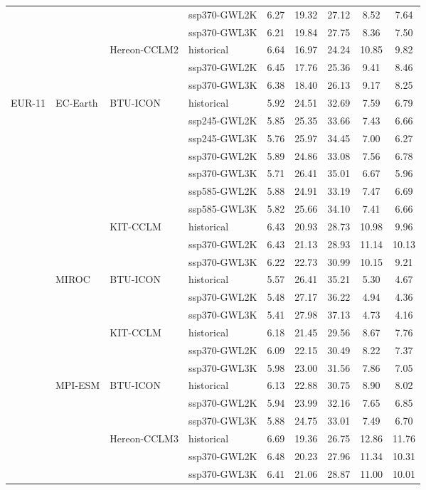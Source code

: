 \begin{table}[!htbp]
{\begin{tabular}{lll|l|c|c|c|c|c}
 &  &  & ssp370-GWL2K & 6.27 & 19.32 & 27.12 & 8.52 & 7.64 \\
 &  &  & ssp370-GWL3K & 6.21 & 19.84 & 27.75 & 8.36 & 7.50 \\
\cmidrule(lr){3-9}
 &  & \multirow{3}{*}{Hereon-CCLM2} & historical & 6.64 & 16.97 & 24.24 & 10.85 & 9.82 \\
 &  &  & ssp370-GWL2K & 6.45 & 17.76 & 25.36 & 9.41 & 8.46 \\
 &  &  & ssp370-GWL3K & 6.38 & 18.40 & 26.13 & 9.17 & 8.25 \\
\midrule
\multirow{22}{*}{EUR-11} & \multirow{10}{*}{EC-Earth} & \multirow{7}{*}{BTU-ICON} & historical & 5.92 & 24.51 & 32.69 & 7.59 & 6.79 \\
 &  &  & ssp245-GWL2K & 5.85 & 25.35 & 33.66 & 7.43 & 6.66 \\
 &  &  & ssp245-GWL3K & 5.76 & 25.97 & 34.45 & 7.00 & 6.27 \\
 &  &  & ssp370-GWL2K & 5.89 & 24.86 & 33.08 & 7.56 & 6.78 \\
 &  &  & ssp370-GWL3K & 5.71 & 26.41 & 35.01 & 6.67 & 5.96 \\
 &  &  & ssp585-GWL2K & 5.88 & 24.91 & 33.19 & 7.47 & 6.69 \\
 &  &  & ssp585-GWL3K & 5.82 & 25.66 & 34.10 & 7.41 & 6.66 \\
\cmidrule(lr){3-9}
 &  & \multirow{3}{*}{KIT-CCLM} & historical & 6.43 & 20.93 & 28.73 & 10.98 & 9.96 \\
 &  &  & ssp370-GWL2K & 6.43 & 21.13 & 28.93 & 11.14 & 10.13 \\
 &  &  & ssp370-GWL3K & 6.22 & 22.73 & 30.99 & 10.15 & 9.21 \\
\cmidrule(lr){3-9}
\cmidrule(lr){2-9}
 & \multirow{6}{*}{MIROC} & \multirow{3}{*}{BTU-ICON} & historical & 5.57 & 26.41 & 35.21 & 5.30 & 4.67 \\
 &  &  & ssp370-GWL2K & 5.48 & 27.17 & 36.22 & 4.94 & 4.36 \\
 &  &  & ssp370-GWL3K & 5.41 & 27.98 & 37.13 & 4.73 & 4.16 \\
\cmidrule(lr){3-9}
 &  & \multirow{3}{*}{KIT-CCLM} & historical & 6.18 & 21.45 & 29.56 & 8.67 & 7.76 \\
 &  &  & ssp370-GWL2K & 6.09 & 22.15 & 30.49 & 8.22 & 7.37 \\
 &  &  & ssp370-GWL3K & 5.98 & 23.00 & 31.56 & 7.86 & 7.05 \\
\cmidrule(lr){3-9}
\cmidrule(lr){2-9}
 & \multirow{6}{*}{MPI-ESM} & \multirow{3}{*}{BTU-ICON} & historical & 6.13 & 22.88 & 30.75 & 8.90 & 8.02 \\
 &  &  & ssp370-GWL2K & 5.94 & 23.99 & 32.16 & 7.65 & 6.85 \\
 &  &  & ssp370-GWL3K & 5.88 & 24.75 & 33.01 & 7.49 & 6.70 \\
\cmidrule(lr){3-9}
 &  & \multirow{3}{*}{Hereon-CCLM3} & historical & 6.69 & 19.36 & 26.75 & 12.86 & 11.76 \\
 &  &  & ssp370-GWL2K & 6.48 & 20.23 & 27.96 & 11.34 & 10.31 \\
 &  &  & ssp370-GWL3K & 6.41 & 21.06 & 28.87 & 11.00 & 10.01 \\
\bottomrule
\end{tabular}
}
\end{table}
